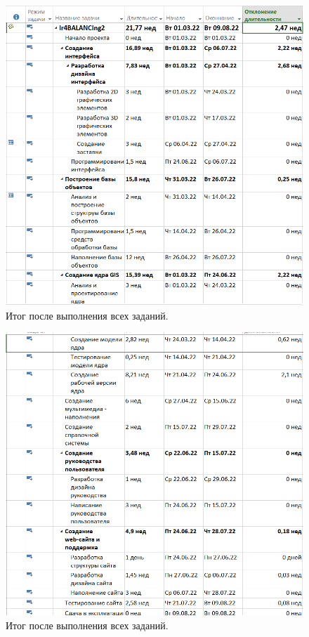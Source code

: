 \documentclass[a4paper,14pt]{extreport} %
\begin{document}
\begin{enumerate}
\begin{figure}[H]
  \centering
  \caption{Итог после выполнения всех заданий. }
  \includegraphics[scale=0.8]{result1}
\end{figure}

\begin{figure}[H]
	\centering
	\caption{Итог после выполнения всех заданий. }
	\includegraphics[scale=0.8]{result2}
\end{figure}


\end{enumerate}
\end{document}
